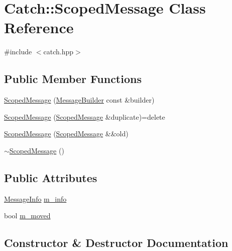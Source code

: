 \hypertarget{class_catch_1_1_scoped_message}{}\section{Catch\+:\+:Scoped\+Message Class Reference}
\label{class_catch_1_1_scoped_message}


{\ttfamily \#include $<$catch.\+hpp$>$}

\subsection*{Public Member Functions}
\begin{DoxyCompactItemize}
\item 
\mbox{\hyperlink{class_catch_1_1_scoped_message_a5cc59f0f2ebe840e6607f83004d49a17}{Scoped\+Message}} (\mbox{\hyperlink{struct_catch_1_1_message_builder}{Message\+Builder}} const \&builder)
\item 
\mbox{\hyperlink{class_catch_1_1_scoped_message_a5fe2e79afdfd737818c15edfc49f378e}{Scoped\+Message}} (\mbox{\hyperlink{class_catch_1_1_scoped_message}{Scoped\+Message}} \&duplicate)=delete
\item 
\mbox{\hyperlink{class_catch_1_1_scoped_message_aac833a6a2245a26e6bd5c9252ca1caa0}{Scoped\+Message}} (\mbox{\hyperlink{class_catch_1_1_scoped_message}{Scoped\+Message}} \&\&old)
\item 
\mbox{\hyperlink{class_catch_1_1_scoped_message_a43190843f9eeb84a0b42b0bc95fdf93a}{$\sim$\+Scoped\+Message}} ()
\end{DoxyCompactItemize}
\subsection*{Public Attributes}
\begin{DoxyCompactItemize}
\item 
\mbox{\hyperlink{struct_catch_1_1_message_info}{Message\+Info}} \mbox{\hyperlink{class_catch_1_1_scoped_message_ae6e1476f389cc6e1586f033b3747b27b}{m\+\_\+info}}
\item 
bool \mbox{\hyperlink{class_catch_1_1_scoped_message_a4fe5607c1f7407240a0da8405b1c12e7}{m\+\_\+moved}}
\end{DoxyCompactItemize}


\subsection{Constructor \& Destructor Documentation}
\mbox{\label{class_catch_1_1_scoped_message_a5cc59f0f2ebe840e6607f83004d49a17}} 
